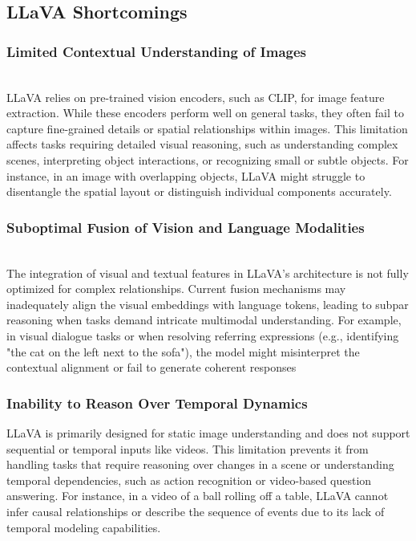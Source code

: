 \documentclass[12pt, conference, compsoc, onecolumn]{IEEEtran}
\begin{document}
	\subsection{LLaVA Shortcomings}
	\subsubsection*{Limited Contextual Understanding of Images}
	\hfill\\
	LLaVA relies on pre-trained vision encoders, such as CLIP, for image feature extraction. While these encoders perform well on general tasks, they often fail to capture fine-grained details or spatial relationships within images. This limitation affects tasks requiring detailed visual reasoning, such as understanding complex scenes, interpreting object interactions, or recognizing small or subtle objects. For instance, in an image with overlapping objects, LLaVA might struggle to disentangle the spatial layout or distinguish individual components accurately.
	\subsubsection*{Suboptimal Fusion of Vision and Language Modalities}
	\hfill\\
	The integration of visual and textual features in LLaVA's architecture is not fully optimized for complex relationships. Current fusion mechanisms may inadequately align the visual embeddings with language tokens, leading to subpar reasoning when tasks demand intricate multimodal understanding. For example, in visual dialogue tasks or when resolving referring expressions (e.g., identifying "the cat on the left next to the sofa"), the model might misinterpret the contextual alignment or fail to generate coherent responses
	\subsubsection*{Inability to Reason Over Temporal Dynamics}
	LLaVA is primarily designed for static image understanding and does not support sequential or temporal inputs like videos. This limitation prevents it from handling tasks that require reasoning over changes in a scene or understanding temporal dependencies, such as action recognition or video-based question answering. For instance, in a video of a ball rolling off a table, LLaVA cannot infer causal relationships or describe the sequence of events due to its lack of temporal modeling capabilities.
	
\end{document}
